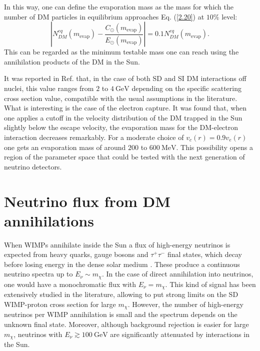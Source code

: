 In this way, one can define the evaporation mass as the mass for which the number of DM particles in equilibrium approaches Eq. (\ref{2.20}) at $10 \%$ level:
\begin{equation}\label{2.21}
	\left| N_{DM}^{eq}(m_{\mathrm{evap}}) - \frac{C_{\odot}(m_{\mathrm{evap}})}{E_{\odot}(m_{\mathrm{evap}})} \right| = 0.1 N_{DM}^{eq}(m_{\mathrm{evap}}).
\end{equation}
This can be regarded as the minimum testable mass one can reach using the annihilation products of the DM in the Sun.

It was reported in Ref. \cite{Palomares2017} that, in the case of both SD and SI DM interactions off nuclei, this value ranges from $2$ to $4 \ \mathrm{GeV}$ depending on the specific scattering cross section value, compatible with the usual assumptions in the literature. What is interesting is the case of the electron capture. It was found that, when one applies a cutoff in the velocity distribution of the DM trapped in the Sun slightly below the escape velocity, the evaporation mass for the DM-electron interaction decreases remarkably. For a moderate choice of $v_{c}(r) = 0.9 v_{e}(r)$ one gets an evaporation mass of around $200$ to $600 \ \mathrm{MeV}$. This possibility opens a region of the parameter space that could be tested with the next generation of neutrino detectors.

\section{Neutrino flux from DM annihilations}
\label{sec:dm_analysis_flux}

When WIMPs annihilate inside the Sun a flux of high-energy neutrinos is expected from heavy quarks, gauge bosons and $\tau^{+}\tau^{-}$ final states, which decay before losing energy in the dense solar medium \cite{Rott2012}. These produce a continuous neutrino spectra up to $E_{\nu} \sim m_{\chi}$. In the case of direct annihilation into neutrinos, one would have a monochromatic flux with $E_{\nu} = m_{\chi}$. This kind of signal has been extensively studied  in the literature, allowing to put strong limits on the SD WIMP-proton cross section for large $m_{\chi}$. However, the number of high-energy neutrinos per WIMP annihilation is small and the spectrum depends on the unknown final state. Moreover, although background rejection is easier for large $m_{\chi}$, neutrinos with $E_{\nu} \gtrsim 100 ~ \mathrm{GeV}$ are significantly attenuated by interactions in the Sun.

